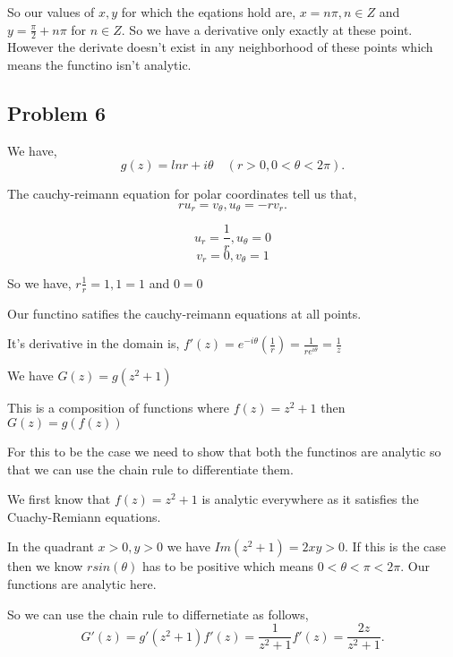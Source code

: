 \documentclass[a4paper]{report}
\begin{document}
So our values of $x,y$ for which the eqations hold are, $x = n\pi, n \in Z$ and $y = \frac{\pi}{2} + n\pi$ for $n \in Z$. So we have a derivative only exactly at these point. However the derivate doesn't exist in any neighborhood of these points which means the functino isn't analytic.

\subsection*{Problem 6}
We have, \[
g(z) = ln r + i \theta \quad (r > 0, 0 < \theta < 2\pi)
.\] 

The cauchy-reimann equation for polar coordinates tell us that, \[
    ru_r = v_{\theta}, u_{\theta} = -r v_r
.\] 

$$u_r = \frac{1}{r}, u_\theta = 0$$
$$v_r = 0, v_\theta = 1$$


So we have, $r \frac{1}{r} = 1, 1 = 1$ and $0 = 0$ 

Our functino satifies the cauchy-reimann equations at all points.

It's derivative in the domain is, $f'(z) = e^{-i\theta}(\frac{1}{r}) = \frac{1}{re^{i\theta}} = \frac{1}{z}$ 

We have $G(z) = g(z^2+ 1)$

This is a composition of functions where $f(z) = z^2 + 1$ then $G(z) = g(f(z))$

For this to be the case we need to show that both the functinos are analytic so that we can use the chain rule to differentiate them.

We first know that $f(z) = z^2 + 1$ is analytic everywhere as it satisfies the Cuachy-Remiann equations.

In the quadrant $x> 0, y > 0$ we have $Im(z^2 + 1) = 2xy > 0$. If this is the case then we know $rsin(\theta)$ has to be positive which means $ 0 < \theta < \pi < 2\pi$. Our functions are analytic here. 

So we can use the chain rule to differnetiate as follows, \[
G'(z) = g'(z^2 + 1) f'(z) = \frac{1}{z^2 + 1} f'(z)  = \frac{2z}{z^2 + 1}
.\] 

                                        
\end{document}
